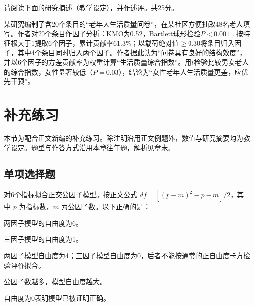 \par\addvspace{6pt}\noindent\begin{minipage}{\linewidth}


请阅读下面的研究摘述（教学设定），并作述评。共25分。

某研究编制了含20个条目的``老年人生活质量问卷''，在某社区方便抽取48名老人填写。作者对20个条目作因子分析：KMO为0.52，Bartlett球形检验\(P<0.001\)；按特征根大于1提取6个因子，累计贡献率61.3\%；以载荷绝对值\(\ge0.30\)将条目归入因子，其中4个条目同时归入两个因子。作者据此认为``问卷具有良好的结构效度''，并以6个因子的方差贡献率为权重计算``生活质量综合指数''。用\(t\)检验比较男女老人的综合指数，女性显著较低（\(P=0.03\)），结论为``女性老年人生活质量更差，应优先干预''。


\end{minipage}\par\vspace{4pt}

\clearpage\section{补充练习}

本节为配合正文新编的补充练习。除注明沿用正文例题外，数值与研究摘要均为教学设定。题型与作答方式沿用本章往年题，解析见章末。

\par\addvspace{6pt}\noindent\begin{minipage}{\linewidth}

\subsection{单项选择题}


对6个指标拟合正交公因子模型。按正文公式 \(df=[(p-m)^2-p-m]/2\)，其中 \(p\) 为指标数，\(m\) 为公因子数。以下正确的是：


\begin{choices}

\item 两因子模型的自由度为6。

\item 三因子模型的自由度为1。

\item 两因子模型自由度为4；三因子模型自由度为0，后者不能按通常的正自由度卡方检验评价拟合。

\item 公因子数越多，模型自由度越大。

\item 自由度为0表明模型已被证明正确。

\end{choices}

\end{minipage}\par\vspace{4pt}

